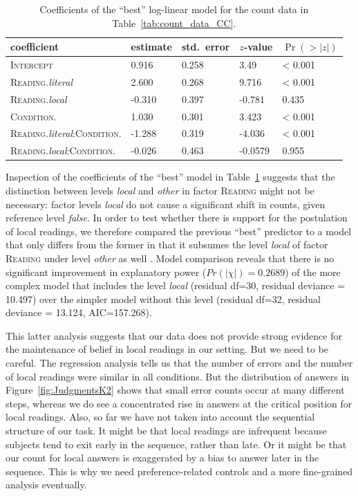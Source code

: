 \documentclass[fleqn,reqno,10pt,draft]{article}
\renewcommand{\es}{\acro{es}}
\begin{document}
\begin{table}
  \centering
  \begin{tabular}{lllll}
    coefficient & estimate & std.~error & $z$-value & $\Pr(>|z|)$ \\
    \midrule
    \textsc{Intercept} & 0.916  &  0.258 &  3.49  & < 0.001 \\
    \textsc{Reading}.\emph{literal} & 2.600 &   0.268 & 9.716 & < 0.001 \\
    \textsc{Reading}.\emph{local} & -0.310  &  0.397 & -0.781 &
    0.435 \\
    \textsc{Condition}.\es & 1.030 &  0.301 & 3.423 &  < 0.001 \\
    \textsc{Reading}.\emph{literal}:\textsc{Condition}.\es & -1.288 &
    0.319 & -4.036 &  < 0.001 \\
    \textsc{Reading}.\emph{local}:\textsc{Condition}.\es & -0.026 &
    0.463 &  -0.0579 &  0.955
  \end{tabular}
  \caption{Coefficients of the ``best'' log-linear model for the count
    data in Table~\ref{tab:count_data_CC}.}
  \label{tab:Coefficients-CC}
\end{table}

Inspection of the coefficients of the ``best'' model in
Table~\ref{tab:Coefficients-CC} suggests that the distinction between
levels \emph{local} and \emph{other} in factor \textsc{Reading} might
not be necessary: factor levels \emph{local} do not cause a
significant shift in counts, given reference level \emph{false}. In
order to test whether there is support for the postulation of local
readings, we therefore compared the previous ``best'' predictor to a
model that only differs from the former in that it subsumes the level
\emph{local} of factor \textsc{Reading} under level \emph{other} as
well \citep[e.g.][Chapter~15]{Crawley2007:The-R-Book}. Model
comparison reveals that there is no significant improvement in
explanatory power ($Pr(|\chi|) = 0.2689$) of the more complex model
that includes the level \emph{local} (residual df=30, residual
deviance = 10.497) over the simpler model without this level (residual
df=32, residual deviance = 13.124, AIC=157.268).

This latter analysis suggests that our data does not provide strong
evidence for the maintenance of belief in local readings in our
setting. But we need to be careful. The regression analysis tells us
that the number of errors and the number of local readings were
similar in all conditions. But the distribution of answers in
Figure~\ref{fig:JudgmentsK2} shows that small error counts occur at
many different steps, whereas we do see a concentrated rise in answers
at the critical position for local readings. Also, so far we have not
taken into account the sequential structure of our task. It might be
that local readings are infrequent because subjects tend to exit early
in the sequence, rather than late. Or it might be that our count for
local answers is exaggerated by a bias to answer later in the
sequence. This is why we need preference-related controls and a more
fine-grained analysis eventually.
\end{document}
